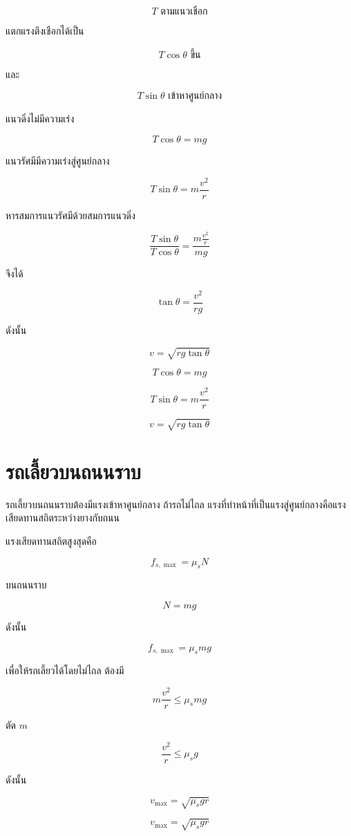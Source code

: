 \[
T \text{ ตามแนวเชือก}
\]

แตกแรงตึงเชือกได้เป็น

\[
T\cos\theta \text{ ขึ้น}
\]

และ

\[
T\sin\theta \text{ เข้าหาศูนย์กลาง}
\]

แนวดิ่งไม่มีความเร่ง

\[
T\cos\theta=mg
\]

แนวรัศมีมีความเร่งสู่ศูนย์กลาง

\[
T\sin\theta=m\frac{v^2}{r}
\]

หารสมการแนวรัศมีด้วยสมการแนวดิ่ง

\[
\frac{T\sin\theta}{T\cos\theta}
=
\frac{m\frac{v^2}{r}}{mg}
\]

จึงได้

\[
\tan\theta=\frac{v^2}{rg}
\]

ดังนั้น

\[
v=\sqrt{rg\tan\theta}
\]

\begin{tcolorbox}[title=ลูกตุ้มกรวย]
\[
T\cos\theta=mg
\]

\[
T\sin\theta=m\frac{v^2}{r}
\]

\[
v=\sqrt{rg\tan\theta}
\]
\end{tcolorbox}

\section{รถเลี้ยวบนถนนราบ}

รถเลี้ยวบนถนนราบต้องมีแรงเข้าหาศูนย์กลาง ถ้ารถไม่ไถล แรงที่ทำหน้าที่เป็นแรงสู่ศูนย์กลางคือแรงเสียดทานสถิตระหว่างยางกับถนน

แรงเสียดทานสถิตสูงสุดคือ

\[
f_{s,\max}=\mu_sN
\]

บนถนนราบ

\[
N=mg
\]

ดังนั้น

\[
f_{s,\max}=\mu_smg
\]

เพื่อให้รถเลี้ยวได้โดยไม่ไถล ต้องมี

\[
m\frac{v^2}{r}\leq \mu_smg
\]

ตัด $m$

\[
\frac{v^2}{r}\leq \mu_sg
\]

ดังนั้น

\[
v_{\max}=\sqrt{\mu_sgr}
\]

\begin{tcolorbox}[title=รถเลี้ยวบนถนนราบ]
\[
v_{\max}=\sqrt{\mu_sgr}
\]
\end{tcolorbox}

